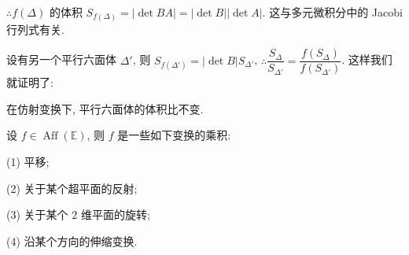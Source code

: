 \documentclass{ctexart}
\begin{document}
$\therefore f(\Delta)$ 的体积 $S_{f(\Delta)}=|\det BA|=|\det B||\det A|$. 这与多元微积分中的 Jacobi 行列式有关.

设有另一个平行六面体 $\Delta'$, 则 $S_{f(\Delta')}=|\det B|S_{\Delta'}$, $\therefore\dfrac{S_{\Delta}}{S_{\Delta'}}=\dfrac{f(S_{\Delta})}{f(S_{\Delta'})}$. 这样我们就证明了:
\begin{theorem}
    在仿射变换下, 平行六面体的体积比不变.
\end{theorem}
\begin{theorem}[书上的定理 11]
    设 $f\in\operatorname{Aff}(\mathbb{E})$, 则 $f$ 是一些如下变换的乘积:

    (1) 平移;
    
    (2) 关于某个超平面的反射;

    (3) 关于某个 $2$ 维平面的旋转;

    (4) 沿某个方向的伸缩变换.
\end{theorem}
\end{document}
